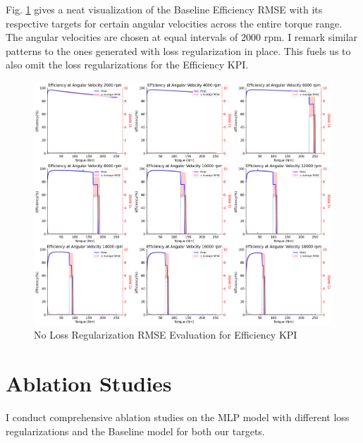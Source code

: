 \documentclass{report} %
\begin{document}
Fig. \ref{fig:No Loss Regularization RMSE Evaluation for Efficiency KPI} gives a neat visualization of the Baseline Efficiency \ac{RMSE} with its respective targets 
for certain angular velocities across the entire torque range. The angular velocities are chosen at equal intervals of 2000 rpm.
I remark similar patterns to the ones generated with loss regularization in place. This fuels us to also omit the loss regularizations for the Efficiency \ac{KPI}.
\begin{figure}[H]
    \centering
    \includegraphics[width=1\textwidth]{./ReportImages/rmse_eta_no_lossreg_MLP.png} 
    \caption{No Loss Regularization \ac{RMSE} Evaluation for Efficiency \ac{KPI}} 
    \label{fig:No Loss Regularization RMSE Evaluation for Efficiency KPI}
\end{figure}

\section{Ablation Studies}\label{sec:Ablation Studies}

I conduct comprehensive ablation studies on the \ac{MLP} model with different loss regularizations and the Baseline model for both our targets.
\end{document}
